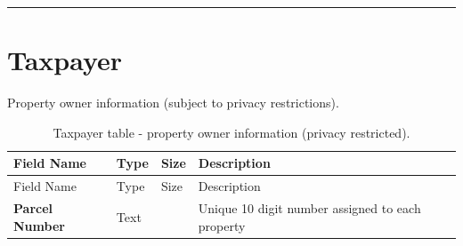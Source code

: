 \documentclass[
  english,
  letterpaper,
  DIV=11,
  numbers=noendperiod]{scrreprt}
\begin{document}
\begin{center}\rule{0.5\linewidth}{0.5pt}\end{center}

\section{Taxpayer}\label{taxpayer-1}

Property owner information (subject to privacy restrictions).

\begin{longtable}[]{@{}
  >{\raggedright\arraybackslash}p{}
  >{\raggedright\arraybackslash}p{}
  >{\raggedright\arraybackslash}p{}
  >{\raggedright\arraybackslash}p{}@{}}
\caption{Taxpayer table - property owner information (privacy
restricted).}\label{tbl-app-taxpayer}\tabularnewline
\toprule\noalign{}
\begin{minipage}[b]{\linewidth}\raggedright
Field Name
\end{minipage} & \begin{minipage}[b]{\linewidth}\raggedright
Type
\end{minipage} & \begin{minipage}[b]{\linewidth}\raggedright
Size
\end{minipage} & \begin{minipage}[b]{\linewidth}\raggedright
Description
\end{minipage} \\
\midrule\noalign{}
\endfirsthead
\toprule\noalign{}
\begin{minipage}[b]{\linewidth}\raggedright
Field Name
\end{minipage} & \begin{minipage}[b]{\linewidth}\raggedright
Type
\end{minipage} & \begin{minipage}[b]{\linewidth}\raggedright
Size
\end{minipage} & \begin{minipage}[b]{\linewidth}\raggedright
Description
\end{minipage} \\
\midrule\noalign{}
\endhead
\bottomrule\noalign{}
\endlastfoot
\textbf{Parcel Number} & Text & 10 & Unique 10 digit number assigned to
each property \\
\end{longtable}
\end{document}
